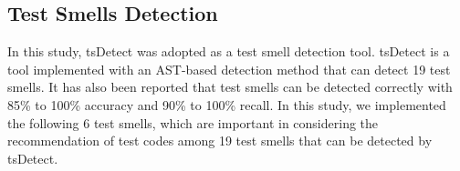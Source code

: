 \documentclass[conference]{IEEEtran}
\begin{document}
\subsection{Test Smells Detection}
In this study, tsDetect\cite{b10} was adopted as a test smell detection tool. tsDetect is a tool implemented with an AST-based detection method that can detect 19 test smells. It has also been reported that test smells can be detected correctly with 85\% to 100\% accuracy and 90\% to 100\% recall. In this study, we implemented the following 6 test smells, which are important in considering the recommendation of test codes among 19 test smells that can be detected by tsDetect\cite{b9}.

\end{document}
